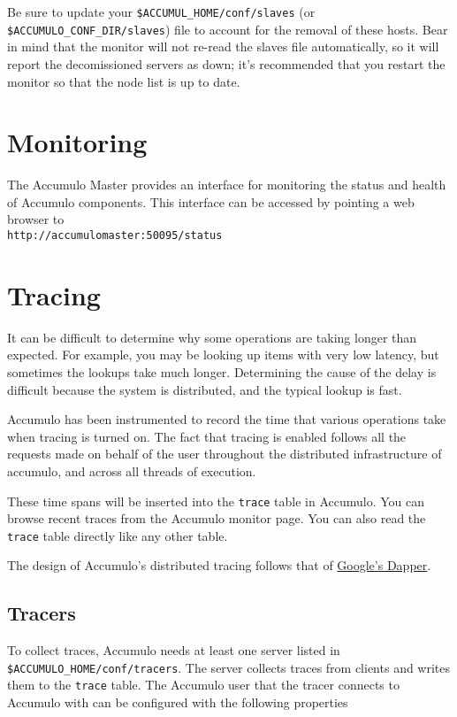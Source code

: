 Be sure to update your \texttt{\$ACCUMUL\_HOME/conf/slaves} (or \texttt{\$ACCUMULO\_CONF\_DIR/slaves}) file to 
account for the removal of these hosts. Bear in mind that the monitor will not re-read the 
slaves file automatically, so it will report the decomissioned servers as down; it's 
recommended that you restart the monitor so that the node list is up to date.

\section{Monitoring}

The Accumulo Master provides an interface for monitoring the status and health of
Accumulo components. This interface can be accessed by pointing a web browser to\\
\texttt{http://accumulomaster:50095/status}

\section{Tracing}
It can be difficult to determine why some operations are taking longer
than expected. For example, you may be looking up items with very low
latency, but sometimes the lookups take much longer. Determining the
cause of the delay is difficult because the system is distributed, and
the typical lookup is fast.

Accumulo has been instrumented to record the time that various
operations take when tracing is turned on. The fact that tracing is
enabled follows all the requests made on behalf of the user throughout
the distributed infrastructure of accumulo, and across all threads of
execution.

These time spans will be inserted into the \texttt{trace} table in
Accumulo. You can browse recent traces from the Accumulo monitor
page. You can also read the \texttt{trace} table directly like any
other table.

The design of Accumulo's distributed tracing follows that of
\href{http://research.google.com/pubs/pub36356.html}{Google's Dapper}.

\subsection{Tracers}
To collect traces, Accumulo needs at least one server listed in
\\\texttt{\$ACCUMULO\_HOME/conf/tracers}. The server collects traces
from clients and writes them to the \texttt{trace} table. The Accumulo
user that the tracer connects to Accumulo with can be configured with
the following properties


